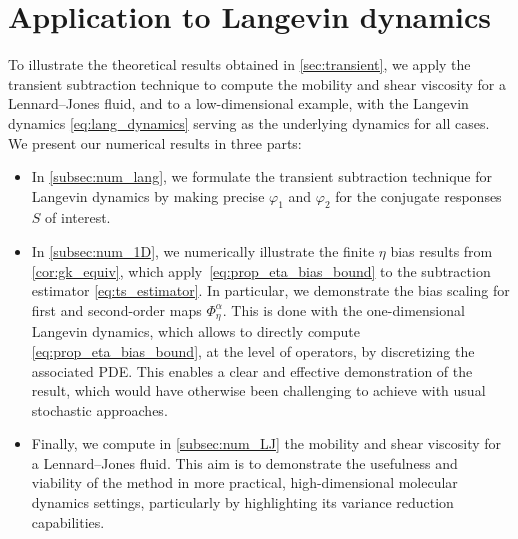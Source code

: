\documentclass[11pt]{article}
\theoremstyle{definition}
\begin{document}
\section{Application to Langevin dynamics}
\label{sec:numerical_lang}
To illustrate the theoretical results obtained in \cref{sec:transient}, we apply the transient subtraction technique to compute the mobility and shear viscosity for a Lennard--Jones fluid, and to a low-dimensional example, with the Langevin dynamics \eqref{eq:lang_dynamics} serving as the underlying dynamics for all cases. We present our numerical results in three parts:
\begin{itemize}
	\item In \cref{subsec:num_lang}, we formulate the transient subtraction technique for Langevin dynamics by making precise $\varphi_1$ and $\varphi_2$ for the conjugate responses $S$ of interest.
\item In \cref{subsec:num_1D}, we numerically illustrate the finite $\eta$ bias results from \cref{cor:gk_equiv}, which apply~\eqref{eq:prop_eta_bias_bound} to the subtraction estimator \eqref{eq:ts_estimator}. In particular, we demonstrate the bias scaling for first and second-order maps $\Phi_\eta^\alpha$. This is done with the one-dimensional Langevin dynamics, which allows to directly compute \eqref{eq:prop_eta_bias_bound}, at the level of operators, by discretizing the associated PDE. This enables a clear and effective demonstration of the result, which would have otherwise been challenging to achieve with usual stochastic approaches. \item Finally, we compute in \cref{subsec:num_LJ} the mobility and shear viscosity for a Lennard--Jones fluid. This aim is to demonstrate the usefulness and viability of the method in more practical, high-dimensional molecular dynamics settings, particularly by highlighting its variance reduction capabilities.
\end{itemize}
\end{document}

